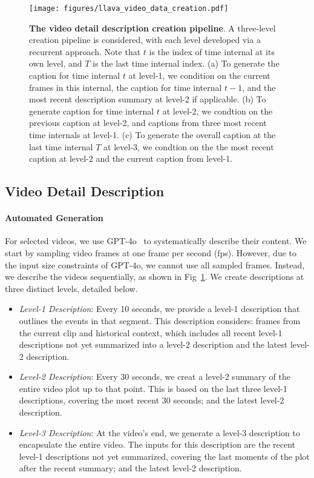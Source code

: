 \begin{figure}[t!]
\centering
\texttt{[image: figures/llava\_video\_data\_creation.pdf]}
\caption{\textbf{The video detail description creation pipeline}. A three-level creation pipeline is considered, with each level developed via a recurrent approach. 
Note that $t$ is the index of time internal at its own level, and $T$ is the last time internal index. 
(a) To generate the caption for time internal $t$ at level-1, we condition on the current frames in this internal, the caption for time internal $t-1$, and the most recent description summary at level-2 if applicable. 
(b) To generate caption for time internal $t$ at level-2, we condtion on the previous caption at level-2, and captions from three most recent time internals at level-1.
(c) To generate the overall caption at the last time internal $T$ at level-3, we condtion on the the most recent caption at level-2 and the current caption from level-1.
}
\label{fig:data_generation}
\end{figure}

\subsection{Video Detail Description}
\label{sec:dataset;subsec:video_detail_description}
\paragraph{Automated Generation}
For selected videos, we use GPT-4o~\citep{openai2024gpt4o} to systematically describe their content. We start by sampling video frames at one frame per second (fps). However, due to the input size constraints of GPT-4o, we cannot use all sampled frames. Instead, we describe the videos sequentially, as shown in Fig~\ref{fig:data_generation}. We create descriptions at three distinct levels, detailed below.

\begin{itemize}[leftmargin=7.5mm]
\setlength{\itemsep}{2pt}
\item {\it Level-1 Description}: Every 10 seconds, we provide a level-1 description that outlines the events in that segment. This description considers: frames from the current clip and historical context, which includes all recent level-1 descriptions not yet summarized into a level-2 description and the latest level-2 description.

\item {\it Level-2 Description}: Every 30 seconds, we creat a level-2 summary of the entire video plot up to that point. This is based on the last three level-1 descriptions, covering the most recent 30 seconds; and the latest level-2 description.

\item {\it Level-3 Description}: At the video's end, we generate a level-3 description to encapsulate the entire video. The inputs for this description are the recent level-1 descriptions not yet summarized, covering the last moments of the plot after the recent summary; and the latest level-2 description.
\end{itemize}

